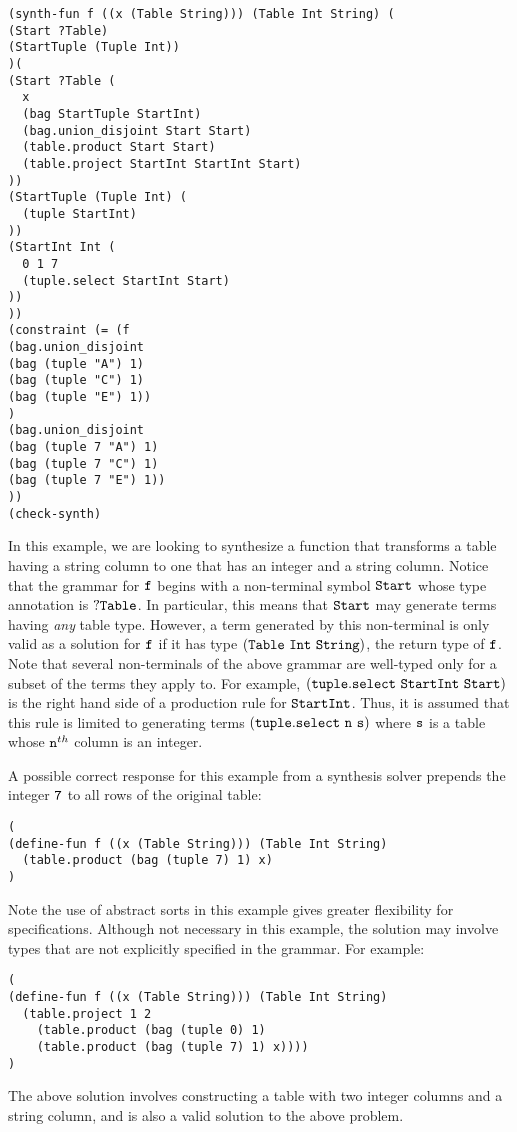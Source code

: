 \documentclass[english,a4paper,10pt]{article}
\begin{document}
\begin{verbatim}
(synth-fun f ((x (Table String))) (Table Int String) (
(Start ?Table)
(StartTuple (Tuple Int))
)(
(Start ?Table (
  x
  (bag StartTuple StartInt)
  (bag.union_disjoint Start Start)
  (table.product Start Start)
  (table.project StartInt StartInt Start)
))
(StartTuple (Tuple Int) (
  (tuple StartInt)
))
(StartInt Int (
  0 1 7
  (tuple.select StartInt Start)
))
))
(constraint (= (f 
(bag.union_disjoint
(bag (tuple "A") 1)
(bag (tuple "C") 1)
(bag (tuple "E") 1))
)
(bag.union_disjoint
(bag (tuple 7 "A") 1)
(bag (tuple 7 "C") 1)
(bag (tuple 7 "E") 1))
))
(check-synth)
\end{verbatim}
In this example, we are looking to synthesize a function that transforms
a table having a string column to one that has an integer and a string column.
Notice that the grammar for ${\tt f}$ begins with a non-terminal
symbol ${\tt Start}$ whose type annotation is ${\tt ?Table}$.
In particular, this means that ${\tt Start}$ may generate terms having
\emph{any} table type. However, a term generated by this non-terminal is
only valid as a solution for ${\tt f}$ if it has type ${\tt (Table\ Int\ String)}$,
the return type of ${\tt f}$.
Note that several non-terminals of the above grammar are well-typed only for a subset of the terms they apply to.
For example, ${\tt (tuple.select\ StartInt\ Start)}$ is the right hand side of
a production rule for ${\tt StartInt}$.
Thus, it is assumed that this rule is limited to generating terms
${\tt (tuple.select\ n\ s)}$ where ${\tt s}$ is a table whose ${\tt n}^{th}$ column is an integer.

A possible correct response for this example from a synthesis solver 
prepends the integer ${\tt 7}$ to all rows of the original table:
\begin{verbatim}
(
(define-fun f ((x (Table String))) (Table Int String) 
  (table.product (bag (tuple 7) 1) x)
)
\end{verbatim}

Note the use of abstract sorts in this example gives
greater flexibility for specifications. 
Although not necessary in this example, the solution
may involve types that are not explicitly specified in the grammar.
For example:
\begin{verbatim}
(
(define-fun f ((x (Table String))) (Table Int String) 
  (table.project 1 2 
    (table.product (bag (tuple 0) 1) 
    (table.product (bag (tuple 7) 1) x))))
)
\end{verbatim}
The above solution involves constructing a table with two integer columns and a string column,
and is also a valid solution to the above problem.
\end{document}

